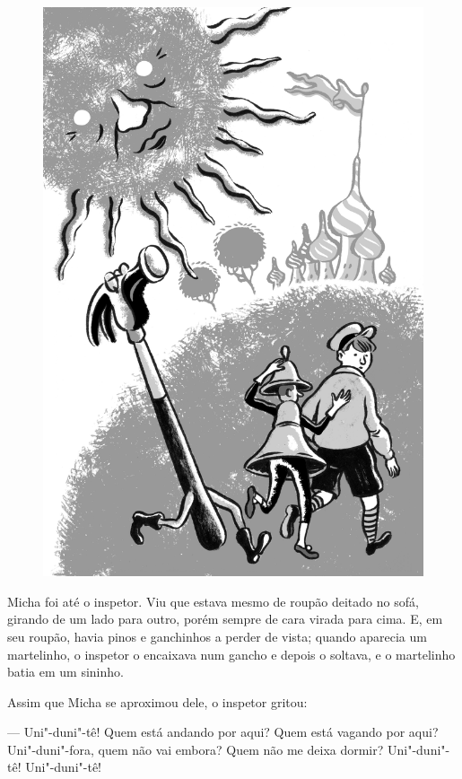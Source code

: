 \begin{figure}%
\vspace*{-2.2cm}
\hspace*{-2.6cm}\includegraphics{./imgs/cena2.jpg}
\end{figure}

Micha foi até o inspetor. Viu que estava mesmo de roupão deitado no
sofá, girando de um lado para outro, porém sempre de cara virada para
cima. E, em seu roupão, havia pinos e ganchinhos a perder de vista;
quando aparecia um martelinho, o inspetor o encaixava num gancho e
depois o soltava, e o martelinho batia em um sininho.


Assim que Micha se aproximou dele, o inspetor gritou:

--- Uni"-duni"-tê! Quem está andando por aqui? Quem está vagando por aqui?
Uni"-duni"-fora, quem não vai embora? Quem não me deixa dormir?
Uni"-duni"-tê! Uni"-duni"-tê!

